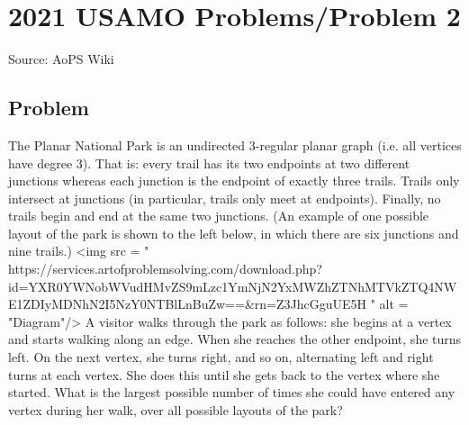 \documentclass[12pt]{article}
\begin{document}
\section*{{2021 USAMO Problems/Problem 2}}
Source: AoPS Wiki

\subsection*{Problem}
The Planar National Park is an undirected 3-regular planar graph (i.e. all vertices have degree 3). That is: every trail has its two endpoints at two different junctions whereas each junction is the endpoint of exactly three trails. Trails only intersect at junctions (in particular, trails only meet at endpoints). Finally, no trails begin and end at the same two junctions. (An example of one possible layout of the park is shown to the left below, in which there are six junctions and nine trails.) <img src = " https://services.artofproblemsolving.com/download.php?id=YXR0YWNobWVudHMvZS9mLzc1YmNjN2YxMWZhZTNhMTVkZTQ4NWE1ZDIyMDNhN2I5NzY0NTBlLnBuZw==&rn=Z3JhcGguUE5H " alt = "Diagram"/> A visitor walks through the park as follows: she begins at a vertex and starts walking along an edge. When she reaches the other endpoint, she turns left. On the next vertex, she turns right, and so on, alternating left and right turns at each vertex. She does this until she gets back to the vertex where she started. What is the largest possible number of times she could have entered any vertex during her walk, over all possible layouts of the park?
\end{document}
